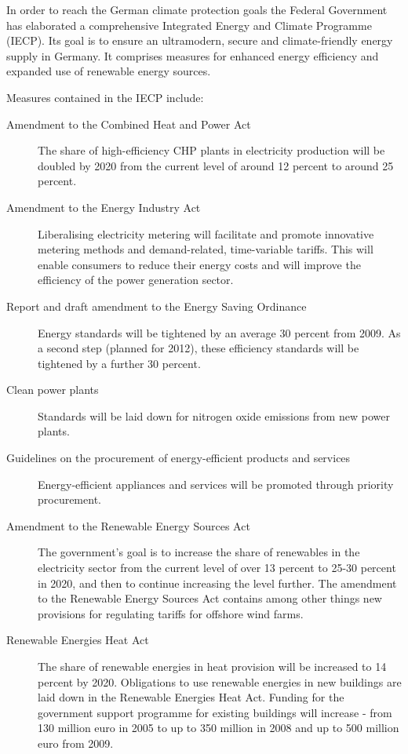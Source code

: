 In order to reach the German climate protection goals the Federal Government has elaborated a comprehensive Integrated Energy and Climate Programme (IECP). 
Its goal is to ensure an ultramodern, secure and climate-friendly energy supply in Germany. 
It comprises measures for enhanced energy efficiency and expanded use of renewable energy sources.


Measures contained in the IECP include:
\begin{description}
	\item[Amendment to the Combined Heat and Power Act] The share of high-efficiency CHP plants in electricity production will be doubled by 2020 from the current level of around 12 percent to around 25 percent.
	\item[Amendment to the Energy Industry Act] Liberalising electricity metering will facilitate and promote innovative metering methods and demand-related, time-variable tariffs. This will enable consumers to reduce their energy costs and will improve the efficiency of the power generation sector.
	\item[Report and draft amendment to the Energy Saving Ordinance] Energy standards will be tightened by an average 30 percent from 2009. As a second step (planned for 2012), these efficiency standards will be tightened by a further 30 percent.
	\item[Clean power plants] Standards will be laid down for nitrogen oxide emissions from new power plants.
	\item[Guidelines on the procurement of energy-efficient products and services] Energy-efficient appliances and services will be promoted through priority procurement.
	\item[Amendment to the Renewable Energy Sources Act] The government’s goal is to increase the share of renewables in the electricity sector from the current level of over 13 percent to 25-30 percent in 2020, and then to continue increasing the level further. The amendment to the Renewable Energy Sources Act contains among other things new provisions for regulating tariffs for offshore wind farms.
	\item[Renewable Energies Heat Act] The share of renewable energies in heat provision will be increased to 14 percent by 2020. Obligations to use renewable energies in new buildings are laid down in the Renewable Energies Heat Act. Funding for the government support programme for existing buildings will increase - from 130 million euro in 2005 to up to 350 million in 2008 and up to 500 million euro from 2009.

\end{description}
